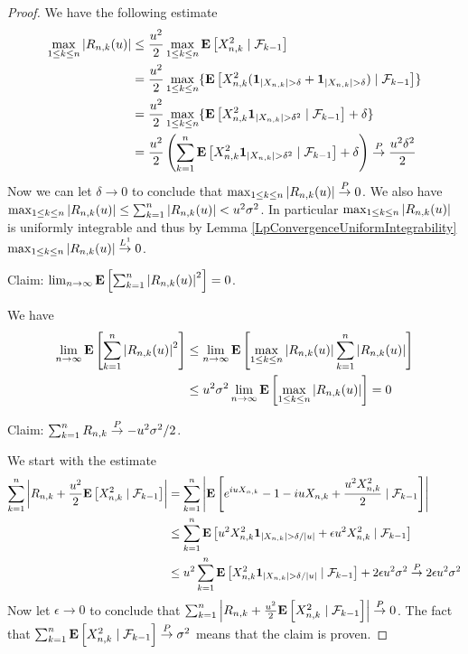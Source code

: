 \begin{proof}
We have the following estimate
\begin{align*}
\max_{1 \leq k \leq n} \abs{R_{n,k}(u)}
&\leq
\frac{u^2}{2}\max_{1 \leq k \leq n} \cexpectationlong{\mathcal{F}_{k-1}}{X^2_{n,k}} \\
&=
\frac{u^2}{2}\max_{1 \leq k \leq n} \lbrace \cexpectationlong{\mathcal{F}_{k-1}}{X^2_{n,k} (\characteristic{\abs{X_{n,k}} > \delta}+ 
\characteristic{\abs{X_{n,k}} > \delta})}  \rbrace \\
&=
\frac{u^2}{2}\max_{1 \leq k \leq n} \lbrace \cexpectationlong{\mathcal{F}_{k-1}}{X^2_{n,k} \characteristic{\abs{X_{n,k}} > \delta^2}} + 
\delta \rbrace \\
&=
\frac{u^2}{2} \left(\sum_{k=1}^n \cexpectationlong{\mathcal{F}_{k-1}}{X^2_{n,k} \characteristic{\abs{X_{n,k}} > \delta^2}} + 
\delta \right ) \toprob \frac{u^2 \delta^2}{2}\\
\end{align*}
Now we can let $\delta \to 0$ to conclude that $\max_{1 \leq k \leq n} \abs{R_{n,k}(u)} \toprob 0$.  We also have
$\max_{1 \leq k \leq n} \abs{R_{n,k}(u)} \leq \sum_{k=1}^n \abs{R_{n,k}(u)} < u^2 \sigma^2$.  In particular 
$\max_{1 \leq k \leq n} \abs{R_{n,k}(u)}$ is uniformly integrable and thus by Lemma \ref{LpConvergenceUniformIntegrability} 
$\max_{1 \leq k \leq n} \abs{R_{n,k}(u)} \tolp{1} 0$.


Claim: $\lim_{n \to \infty} \expectation{\sum_{k=1}^n \abs{R_{n,k}(u)}^2} = 0$.

We have 
\begin{align*}
\lim_{n \to \infty} \expectation{\sum_{k=1}^n \abs{R_{n,k}(u)}^2}
&\leq \lim_{n \to \infty} \expectation{\max_{1 \leq k \leq n} \abs{R_{n,k}(u)} \sum_{k=1}^n \abs{R_{n,k}(u)}} \\
&\leq u^2 \sigma^2 \lim_{n \to \infty} \expectation{\max_{1 \leq k \leq n} \abs{R_{n,k}(u)} } = 0\\
\end{align*}

Claim: $\sum_{k=1}^n R_{n,k} \toprob -u^2 \sigma^2/2$.

We start with the estimate
\begin{align*}
\sum_{k=1}^n \abs{R_{n,k} + \frac{u^2}{2} \cexpectationlong{\mathcal{F}_{k-1}}{X^2_{n,k}}}
&=
\sum_{k=1}^n \abs{\cexpectationlong{\mathcal{F}_{k-1}}{e^{iuX_{n,k}} -1 - iuX_{n,k} + \frac{u^2 X^2_{n,k}}{2}}} \\
&\leq
\sum_{k=1}^n \cexpectationlong{\mathcal{F}_{k-1}}{u^2 X^2_{n,k} \characteristic{\abs{X_{n,k}} > \delta/\abs{u}} + \epsilon u^2 X^2_{n,k}} \\
&\leq
u^2 \sum_{k=1}^n \cexpectationlong{\mathcal{F}_{k-1}}{X^2_{n,k} \characteristic{\abs{X_{n,k}} > \delta/\abs{u}}} +
 2 \epsilon u^2 \sigma^2 \toprob  2 \epsilon u^2 \sigma^2
\end{align*}
Now let $\epsilon \to 0$ to conclude that $\sum_{k=1}^n \abs{R_{n,k} + \frac{u^2}{2} \cexpectationlong{\mathcal{F}_{k-1}}{X^2_{n,k}}} \toprob 0$.  The fact that $\sum_{k=1}^n \cexpectationlong{\mathcal{F}_{k-1}}{X^2_{n,k}} \toprob \sigma^2$ means that the claim is proven.


\end{proof}
